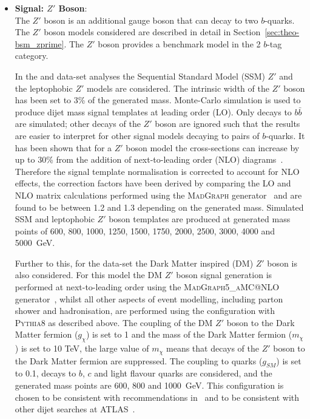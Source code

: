 \begin{itemize}[leftmargin=*]
\item\textbf{Signal: $Z'$ Boson}:  \\
  The $Z'$ boson is an additional gauge boson that can decay to two $b$-quarks.
  The $Z'$ boson models considered are
  described in detail in Section~\ref{sec:theo-bsm_zprime}.
  The $Z'$ boson provides a benchmark model in the 2 $b$-tag category. \vspace{1em}

  In the \summer{} and \lm{} data-set analyses
  the Sequential Standard Model (SSM) $Z'$ and the leptophobic $Z'$ models are considered.
  The intrinsic width of the $Z'$ boson has been set to 3\% of the generated mass.
  Monte-Carlo simulation is used to produce dijet mass signal templates at leading order (LO).
  Only decays to $b\bar{b}$ are simulated;
  other decays of the  $Z'$ boson are ignored such that the
  results are easier to interpret for other signal models decaying to pairs of $b$-quarks.
  It has been shown that for a $Z'$ boson model the cross-sections can increase by up to 30\%
  from the addition of next-to-leading order (NLO) diagrams~\cite{evt-NLO_zprime}.
  Therefore the signal template normalisation is corrected to account for NLO effects,
  the correction factors have been derived by comparing
  the LO and NLO matrix calculations performed using the \textsc{MadGraph} generator~\cite{dibjet-madGraph}
  and are found to be between 1.2 and 1.3 depending on the generated mass.
  Simulated SSM and leptophobic $Z'$ boson templates are produced at generated mass points of
  600, 800, 1000, 1250, 1500, 1750, 2000, 2500, 3000, 4000 and 5000~GeV.  \vspace{1em}
  
  Further to this, for the \lm{} data-set
  the Dark Matter inspired (DM) $Z'$ boson is also considered.
  For this model the DM $Z'$ boson signal generation is performed at next-to-leading order using the \textsc{MadGraph5\_aMC@NLO} generator~\cite{dibjet-madGraph_NLO},
  whilst all other aspects of event modelling, including parton shower and hadronisation, are performed using the configuration with \textsc{Pythia8} as described above.
  The coupling of the DM $Z'$ boson to the Dark Matter fermion ($g_{\chi}$) is set to 1 and
  the mass of the Dark Matter fermion ($m_{\chi}$) is set to 10 TeV,
  the large value of $m_\chi$ means that decays of the $Z'$ boson to the Dark Matter fermion are suppressed.
  The coupling to quarks ($g_{SM}$) is set to 0.1,
  decays to $b$, $c$ and light flavour quarks are considered,
  and the generated mass points are 600, 800 and 1000~GeV.
  This configuration is chosen to be consistent with recommendations in~\cite{theo_bsm-zprime_dm}
  and to be consistent with other dijet searches at ATLAS~\cite{dijet-mori16_paper}.  \vspace{1em}


\end{itemize}
